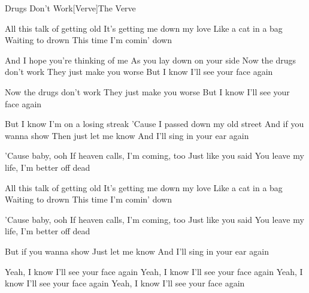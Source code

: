 \begin{Song}{Drugs Don't Work}[Verve]{The Verve}
\begin{multicols}{2}
\begin{Verse}
All this talk of getting old
It's getting me down my love
Like a cat in a bag
Waiting to drown
This time I'm comin' down
\espaceInterStrophe

And I hope you're thinking of me
As you lay down on your side
Now the drugs don't work
They just make you worse
But I know I'll see your face again
\end{Verse}
\espaceInterStrophe

\begin{Chorus}
Now the drugs don't work
They just make you worse
But I know I'll see your face again
\end{Chorus}
\espaceInterStrophe

\begin{Verse}
But I know I'm on a losing streak
'Cause I passed down my old street
And if you wanna show
Then just let me know
And I'll sing in your ear again
\end{Verse}
\espaceInterStrophe

\tochorus
\espaceInterStrophe

\begin{Bridge}
'Cause baby, ooh
If heaven calls, I'm coming, too
Just like you said
You leave my life, I'm better off dead
\end{Bridge}
\columnbreak

\begin{Verse}
All this talk of getting old
It's getting me down my love
Like a cat in a bag
Waiting to drown
This time I'm comin' down
\end{Verse}
\espaceInterStrophe

\tochorus
\espaceInterStrophe

\begin{Bridge}
'Cause baby, ooh
If heaven calls, I'm coming, too
Just like you said
You leave my life, I'm better off dead
\end{Bridge}
\espaceInterStrophe

\begin{Verse}
But if you wanna show
Just let me know
And I'll sing in your ear again
\end{Verse}
\espaceInterStrophe

\tochorus
\espaceInterStrophe
\begin{Chorus}
Yeah, I know I'll see your face again
Yeah, I know I'll see your face again
Yeah, I know I'll see your face again
Yeah, I know I'll see your face again
\espaceInterStrophe


\end{Chorus}
\end{multicols}
\end{Song}
